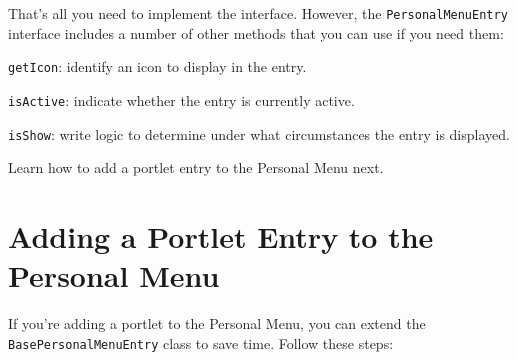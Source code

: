 That's all you need to implement the interface. However, the
\texttt{PersonalMenuEntry} interface includes a number of other methods
that you can use if you need them:

\texttt{getIcon}: identify an icon to display in the entry.

\texttt{isActive}: indicate whether the entry is currently active.

\texttt{isShow}: write logic to determine under what circumstances the
entry is displayed.

Learn how to add a portlet entry to the Personal Menu next.

\section{Adding a Portlet Entry to the Personal
Menu}\label{adding-a-portlet-entry-to-the-personal-menu}

If you're adding a portlet to the Personal Menu, you can extend the
\texttt{BasePersonalMenuEntry} class to save time. Follow these steps:

